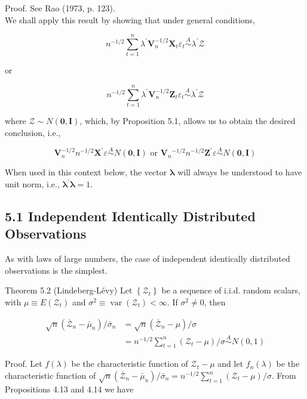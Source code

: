 \documentclass[10pt]{article}
\begin{document}
Proof. See Rao (1973, p. 123).\\
We shall apply this result by showing that under general conditions,

$$
n^{-1 / 2} \sum_{t=1}^{n} \lambda^{\prime} \mathbf{V}_{n}^{-1 / 2} \mathbf{X}_{t} \varepsilon_{t} \stackrel{A}{\sim} \lambda^{\prime} \mathcal{Z}
$$

or

$$
n^{-1 / 2} \sum_{t=1}^{n} \lambda^{\prime} \mathbf{V}_{n}^{-1 / 2} \mathbf{Z}_{t} \varepsilon_{t} \stackrel{A}{\sim} \lambda^{\prime} \mathcal{Z}
$$

where $\mathcal{Z} \sim N(\mathbf{0}, \mathbf{I})$, which, by Proposition 5.1, allows us to obtain the desired conclusion, i.e.,

$$
\mathbf{V}_{n}^{-1 / 2} n^{-1 / 2} \mathbf{X}^{\prime} \varepsilon \stackrel{A}{\sim} N(\mathbf{0}, \mathbf{I}) \text { or } \mathbf{V}_{n}{ }^{-1 / 2} n^{-1 / 2} \mathbf{Z}^{\prime} \varepsilon \stackrel{A}{\sim} N(\mathbf{0}, \mathbf{I})
$$

When used in this context below, the vector $\boldsymbol{\lambda}$ will always be understood to have unit norm, i.e., $\boldsymbol{\lambda}^{\prime} \boldsymbol{\lambda}=1$.

\subsection*{5.1 Independent Identically Distributed Observations}
As with laws of large numbers, the case of independent identically distributed observations is the simplest.

Theorem 5.2 (Lindeberg-Lévy) Let $\left\{\mathcal{Z}_{t}\right\}$ be a sequence of i.i.d. random scalars, with $\mu \equiv E\left(\mathcal{Z}_{t}\right)$ and $\sigma^{2} \equiv \operatorname{var}\left(\mathcal{Z}_{t}\right)<\infty$. If $\sigma^{2} \neq 0$, then

$$
\begin{aligned}
\sqrt{n}\left(\overline{\mathcal{Z}}_{n}-\bar{\mu}_{n}\right) / \bar{\sigma}_{n} & =\sqrt{n}\left(\overline{\mathcal{Z}}_{n}-\mu\right) / \sigma \\
& =n^{-1 / 2} \sum_{t=1}^{n}\left(\mathcal{Z}_{t}-\mu\right) / \sigma \stackrel{A}{\sim} N(0,1)
\end{aligned}
$$

Proof. Let $f(\lambda)$ be the characteristic function of $\mathcal{Z}_{t}-\mu$ and let $f_{n}(\lambda)$ be the characteristic function of $\sqrt{n}\left(\overline{\mathcal{Z}}_{n}-\bar{\mu}_{n}\right) / \bar{\sigma}_{n}=n^{-1 / 2} \sum_{t=1}^{n}\left(\mathcal{Z}_{t}-\mu\right) / \sigma$. From Propositions 4.13 and 4.14 we have
\end{document}
